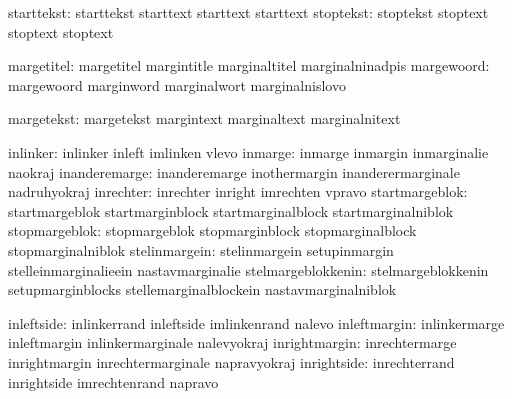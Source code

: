                    starttekst:  starttekst                   starttext
                                starttext                    starttext
                    stoptekst:  stoptekst                    stoptext
                                stoptext                     stoptext

                   margetitel:  margetitel                   margintitle
                                marginaltitel                marginalninadpis
                   margewoord:  margewoord                   marginword
                                marginalwort                 marginalnislovo


                   margetekst:  margetekst                   margintext
                                marginaltext                 marginalnitext

                     inlinker:  inlinker                     inleft
                                imlinken                     vlevo
                      inmarge:  inmarge                      inmargin
                                inmarginalie                 naokraj
                inanderemarge:  inanderemarge                inothermargin
                                inanderermarginale           nadruhyokraj
                    inrechter:  inrechter                    inright
                                imrechten                    vpravo
               startmargeblok:  startmargeblok               startmarginblock
                                startmarginalblock           startmarginalniblok
                stopmargeblok:  stopmargeblok                stopmarginblock
                                stopmarginalblock            stopmarginalniblok
                stelinmargein:  stelinmargein                setupinmargin
                                stelleinmarginalieein        nastavmarginalie
           stelmargeblokkenin:  stelmargeblokkenin           setupmarginblocks
                                stellemarginalblockein       nastavmarginalniblok

                   inleftside:  inlinkerrand                 inleftside
                                imlinkenrand                 nalevo
                 inleftmargin:  inlinkermarge                inleftmargin
                                inlinkermarginale            nalevyokraj
                inrightmargin:  inrechtermarge               inrightmargin
                                inrechtermarginale           napravyokraj
                  inrightside:  inrechterrand                inrightside
                                imrechtenrand                napravo

